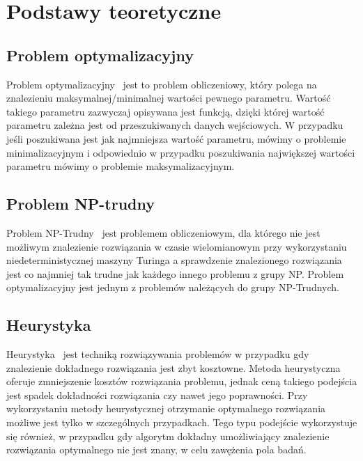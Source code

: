 

\chapter{Podstawy teoretyczne}
\section{Problem optymalizacyjny}
Problem optymalizacyjny~\cite{optimization_problem} jest to problem obliczeniowy, który polega na znalezieniu maksymalnej/minimalnej wartości pewnego parametru. Wartość takiego parametru zazwyczaj opisywana jest funkcją, dzięki której wartość parametru zależna jest od przeszukiwanych danych wejściowych. W przypadku jeśli poszukiwana jest jak najmniejsza wartość parametru, mówimy o problemie minimalizacyjnym i odpowiednio w przypadku poszukiwania największej wartości parametru mówimy o problemie maksymalizacyjnym.

\section{Problem NP-trudny}
Problem NP-Trudny~\cite{np_hard} jest problemem obliczeniowym, dla którego nie jest możliwym znalezienie rozwiązania w czasie wielomianowym przy wykorzystaniu niedeterministycznej maszyny Turinga a sprawdzenie znalezionego rozwiązania jest co najmniej tak trudne jak każdego innego problemu z grupy NP. Problem optymalizacyjny jest jednym z problemów należących do grupy NP-Trudnych.

\section{Heurystyka}
Heurystyka~\cite{heuristic} jest techniką rozwiązywania problemów w przypadku gdy znalezienie dokładnego rozwiązania jest zbyt kosztowne. Metoda heurystyczna oferuje zmniejszenie kosztów rozwiązania problemu, jednak ceną takiego podejścia jest spadek dokładności rozwiązania czy nawet jego poprawności.  Przy wykorzystaniu metody heurystycznej otrzymanie optymalnego rozwiązania możliwe jest tylko w szczególnych przypadkach. Tego typu podejście wykorzystuje się również, w przypadku gdy algorytm dokładny umożliwiający znalezienie rozwiązania optymalnego nie jest znany, w celu zawężenia pola badań.

